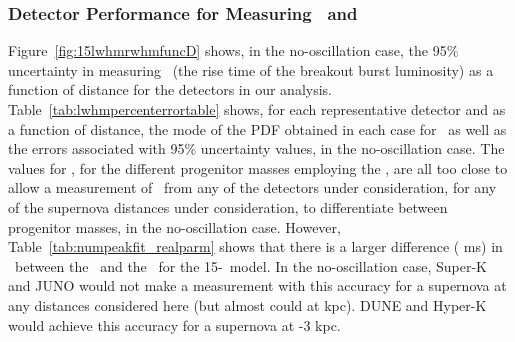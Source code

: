 \subsubsection{Detector Performance for Measuring \trise\ and \tfall}
Figure~\ref{fig:15lwhmrwhmfuncD} shows, in the no-oscillation case,
the  95\% uncertainty in
measuring \trise\ (the rise time of the breakout burst luminosity) as
a function of distance for the detectors in our analysis. 
Table~\ref{tab:lwhmpercenterrortable} shows, for each representative
detector and as a function of distance, the mode of the PDF obtained
in each case for \trise\ as well as the 
errors associated with 95\% uncertainty values, in the no-oscillation case.
The values for \trise, for the different progenitor masses employing the
\ls, are all too close to allow a measurement of \trise\ from
any of the detectors under consideration, for any of the supernova
distances under consideration, to differentiate between progenitor
masses, in the no-oscillation case.  
However, Table~\ref{tab:numpeakfit_realparm} shows that there
is a larger difference ( ms) in \trise\ between the \ls\ and the \shen\ for
the 15-\Msol\ model.  In the no-oscillation case, 
Super-K and JUNO would not make a measurement with this
accuracy for a supernova at any distances considered here (but 
almost could at  kpc). DUNE and Hyper-K would achieve this
accuracy for a supernova at -3 kpc.

